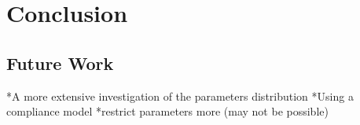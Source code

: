 \chapter{Conclusion}

\section{Future Work}
*A more extensive investigation of the parameters distribution
*Using a compliance model
*restrict parameters more (may not be possible)

